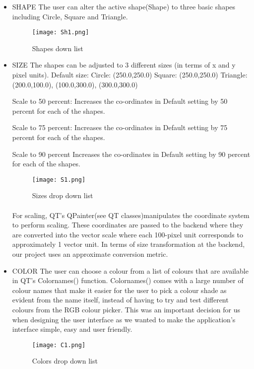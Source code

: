 \documentclass{article}
\begin{document}
\begin{itemize}
    \item SHAPE
    \newline
    The user can alter the active shape(Shape) to three basic shapes including Circle, Square and Triangle. 
    
    \begin{figure}[!h]
\centering
\texttt{[image: Sh1.png]}
\caption{Shapes down list \label{shape}}
\end{figure}


    \item SIZE
    \newline
    The shapes can be adjusted to 3 different sizes (in terms of x and y pixel units). \newline
Default size: \newline
Circle: (250.0,250.0) \newline
Square: (250.0,250.0) \newline
Triangle: (200.0,100.0),  (100.0,300.0), (300.0,300.0)

Scale to 50 percent:
Increases the co-ordinates in Default setting by 50 percent for each of the shapes.

Scale to 75 percent:
Increases the co-ordinates in Default setting by 75 percent for each of the shapes.

Scale to 90 percent
Increases the co-ordinates in Default setting by 90 percent for each of the shapes.

\begin{figure}[!h]
\centering
\texttt{[image: S1.png]}
\caption{Sizes drop down list \label{Size}}
\end{figure}


\paragraph{}
For scaling, QT’s QPainter(see QT classes)manipulates the coordinate system to perform scaling. These coordinates are passed to the backend where they are converted into the vector scale where each 100-pixel unit corresponds to approximately 1 vector unit. In terms of size transformation at the backend, our project uses an approximate conversion metric.

\item COLOR \newline
The user can choose a colour from a list of colours that are available in QT’s Colornames() function. Colornames() comes with a large number of colour names that make it easier for the user to pick a colour shade as evident from the name itself, instead of having to try and test different colours from the RGB colour picker. This was an important decision for us when designing the user interface as we wanted to make the application’s interface simple, easy and user friendly.

\begin{figure}[!h]
\centering
\texttt{[image: C1.png]}
\caption{Colors drop down list \label{Color}}
\end{figure}

\end{itemize}
\end{document}

